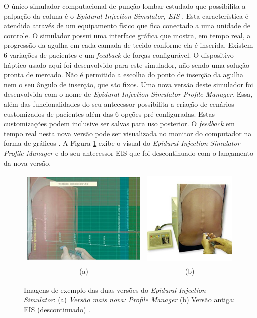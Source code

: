 O único simulador computacional de punção lombar estudado que possibilita a palpação da coluna é o \textit{Epidural Injection Simulator, EIS} \cite{Wilson2003}. Esta característica é atendida através de um equipamento físico que fica conectado a uma unidade de controle. O simulador possui uma interface gráfica que mostra, em tempo real, a progressão da agulha em cada camada de tecido conforme ela é inserida. Existem 6 variações de pacientes e um \textit{feedback} de forças configurável. O dispositivo háptico usado aqui foi desenvolvido para este simulador, não sendo uma solução pronta de mercado. Não é permitida a escolha do ponto de inserção da agulha nem o seu ângulo de inserção, que são fixos. Uma nova versão deste simulador foi desenvolvida com o nome de \textit{Epidural Injection Simulator Profile Manager}. Essa, além das funcionalidades do seu antecessor possibilita a criação de cenários customizados de pacientes além das 6 opções pré-configuradas. Estas customizações podem inclusive ser salvas para uso posterior. O \textit{feedback} em tempo real nesta nova versão pode ser visualizada no monitor do computador na forma de gráficos \cite{CPRSavers&FirstAidSupply2018}. A Figura \ref{fig:EpiduralInjectionSimulator} exibe o visual do \textit{Epidural Injection Simulator Profile Manager} e do seu antecessor EIS que foi descontinuado com o lançamento da nova versão.

\begin{figure}[ht!]
    \centering
        \begin{tabular}{cc}
        \includegraphics[width=0.4\linewidth]{capitulos/figuras/epiduralInjectionSimulatorPM.jpg} & 
        \includegraphics[width=0.3\linewidth]{capitulos/figuras/epiduralInjectionSimulator.jpg} 
        \\
        (a) & (b)
        \end{tabular}
    \caption{Imagens de exemplo das duas versões do \textit{Epidural Injection Simulator}: (a) \textit{Versão mais nova: Profile Manager} (b) Versão antiga: EIS (descontinuado)  \cite{CPRSavers&FirstAidSupply2018}.}
    \label{fig:EpiduralInjectionSimulator}
\end{figure}

